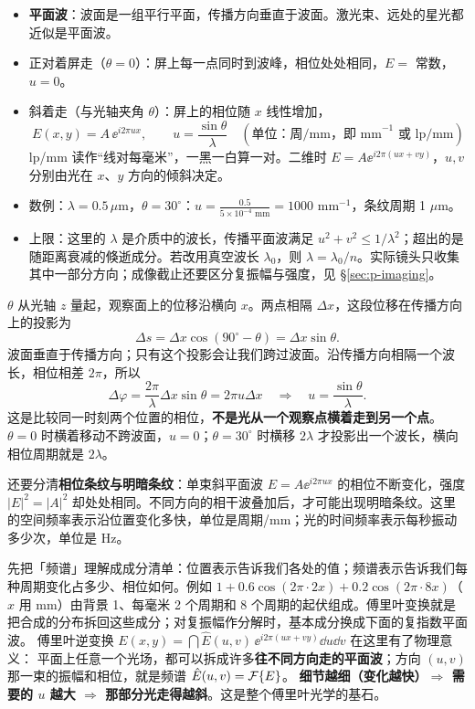 \begin{itemize}
\item \textbf{平面波}：波面是一组平行平面，传播方向垂直于波面。激光束、远处的星光都近似是平面波。
\item 正对着屏走（$\theta=0$）：屏上每一点同时到波峰，相位处处相同，$E=$ 常数，$u=0$。
\item 斜着走（与光轴夹角 $\theta$）：屏上的相位随 $x$ 线性增加，
\[
E(x,y)=A\,\ee^{i2\pi ux},\qquad u=\frac{\sin\theta}{\lambda}\quad(\text{单位：周/mm，即 mm}^{-1}\text{ 或 lp/mm})
\]
lp/mm 读作“线对每毫米”，一黑一白算一对。二维时 $E=A\ee^{i2\pi(ux+vy)}$，$u,v$ 分别由光在 $x$、$y$ 方向的倾斜决定。
\item 数例：$\lambda=0.5\,\mu$m，$\theta=30^\circ$：$u=\frac{0.5}{5\times10^{-4}\text{ mm}}=1000$ mm$^{-1}$，条纹周期 1 $\mu$m。
\item 上限：这里的 $\lambda$ 是介质中的波长，传播平面波满足 $u^2+v^2\le1/\lambda^2$；超出的是随距离衰减的倏逝成分。若改用真空波长 $\lambda_0$，则 $\lambda=\lambda_0/n$。实际镜头只收集其中一部分方向；成像截止还要区分复振幅与强度，见 §\ref{sec:p-imaging}。
\end{itemize}

\begin{idea}
$\theta$ 从光轴 $z$ 量起，观察面上的位移沿横向 $x$。两点相隔 $\Delta x$，这段位移在传播方向上的投影为
\[
\Delta s=\Delta x\cos(90^\circ-\theta)=\Delta x\sin\theta.
\]
波面垂直于传播方向；只有这个投影会让我们跨过波面。沿传播方向相隔一个波长，相位相差 $2\pi$，所以
\[
\Delta\varphi=\frac{2\pi}{\lambda}\Delta x\sin\theta
=2\pi u\Delta x
\quad\Rightarrow\quad u=\frac{\sin\theta}{\lambda}.
\]
这是比较同一时刻两个位置的相位，\textbf{不是光从一个观察点横着走到另一个点}。$\theta=0$ 时横着移动不跨波面，$u=0$；$\theta=30^\circ$ 时横移 $2\lambda$ 才投影出一个波长，横向相位周期就是 $2\lambda$。

还要分清\textbf{相位条纹与明暗条纹}：单束斜平面波 $E=A\ee^{i2\pi ux}$ 的相位不断变化，强度 $|E|^2=|A|^2$ 却处处相同。不同方向的相干波叠加后，才可能出现明暗条纹。这里的空间频率表示沿位置变化多快，单位是周期/mm；光的时间频率表示每秒振动多少次，单位是 Hz。
\end{idea}

先把「频谱」理解成成分清单：位置表示告诉我们各处的值；频谱表示告诉我们每种周期变化占多少、相位如何。例如 $1+0.6\cos(2\pi\cdot2x)+0.2\cos(2\pi\cdot8x)$（$x$ 用 mm）由背景 1、每毫米 2 个周期和 8 个周期的起伏组成。傅里叶变换就是把合成的分布拆回这些成分；对复振幅作分解时，基本成分换成下面的复指数平面波。
傅里叶逆变换 $E(x,y)=\dint\hat E(u,v)\,\ee^{i2\pi(ux+vy)}\dd u\dd v$ 在这里有了物理意义：
平面上任意一个光场，都可以拆成许多\textbf{往不同方向走的平面波}；方向 $(u,v)$ 那一束的振幅和相位，就是频谱 $\hat E(u,v)=\mathcal{F}\{E\}$。
\textbf{细节越细（变化越快）$\Rightarrow$ 需要的 $u$ 越大 $\Rightarrow$ 那部分光走得越斜}。这是整个傅里叶光学的基石。

